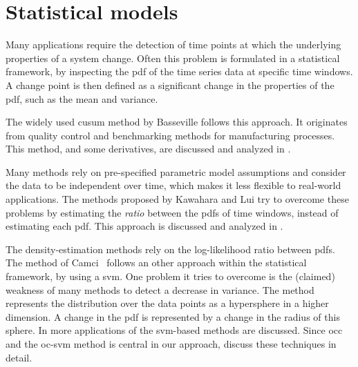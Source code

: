 \section{Statistical models}\label{sec:literature_review_statistical_models}
Many applications require the detection of time points at which the underlying properties of a system change.
Often this problem is formulated in a statistical framework, by inspecting the \gls{pdf} of the time series data at specific time windows.
A change point is then defined as a significant change in the properties of the \gls{pdf}, such as the mean and variance.

The widely used \gls{cusum} method by Basseville \etal \cite{basseville1993detection} follows this approach.
It originates from quality control and benchmarking methods for manufacturing processes.
This method, and some derivatives, are discussed and analyzed in .

Many methods rely on pre-specified parametric model assumptions and consider the data to be independent over time, which makes it less flexible to real-world applications.
The methods proposed by Kawahara \etal \cite{kawahara2009change} and Lui \etal \cite{liu2013change} try to overcome these problems by estimating the \emph{ratio} between the \glspl{pdf} of time windows, instead of estimating each \gls{pdf}.
This approach is discussed and analyzed in .

The density-estimation methods rely on the log-likelihood ratio between \glspl{pdf}.
The method of Camci~\cite{camci2010change} follows an other approach within the statistical framework, by using a \gls{svm}.
One problem it tries to overcome is the (claimed) weakness of many methods to detect a decrease in variance.
The method represents the distribution over the data points as a hypersphere in a higher dimension.
A change in the \gls{pdf} is represented by a change in the radius of this sphere.
In  more applications of the \gls{svm}-based methods are discussed.
Since \gls{occ} and the \gls{oc-svm} method is central in our approach,  discuss these techniques in detail.

